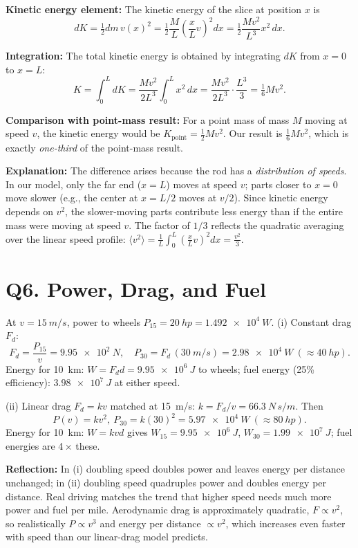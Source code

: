 \documentclass[11pt]{article}
\newcommand{\ans}[1]{\boxed{\displaystyle #1}}
\begin{document}
\textbf{Kinetic energy element:} The kinetic energy of the slice at position $x$ is
\[ dK = \tfrac12 dm\,v(x)^2 = \tfrac12 \frac{M}{L}\left(\frac{x}{L}v\right)^2dx = \tfrac12 \frac{M v^2}{L^3} x^2\,dx. \]

\textbf{Integration:} The total kinetic energy is obtained by integrating $dK$ from $x=0$ to $x=L$:
\[ K = \int_0^L dK = \frac{M v^2}{2L^3}\int_0^L x^2\,dx = \frac{M v^2}{2L^3}\cdot\frac{L^3}{3} = \ans{\tfrac16 M v^2}. \]

\textbf{Comparison with point-mass result:} For a point mass of mass $M$ moving at speed $v$, the kinetic energy would be $K_{\text{point}} = \tfrac12 M v^2$. Our result is $\tfrac16 M v^2$, which is exactly \textit{one-third} of the point-mass result.

\textbf{Explanation:} The difference arises because the rod has a \textit{distribution of speeds}. In our model, only the far end ($x=L$) moves at speed $v$; parts closer to $x=0$ move slower (e.g., the center at $x=L/2$ moves at $v/2$). Since kinetic energy depends on $v^2$, the slower-moving parts contribute less energy than if the entire mass were moving at speed $v$. The factor of $1/3$ reflects the quadratic averaging over the linear speed profile: $\langle v^2 \rangle = \frac{1}{L}\int_0^L \left(\frac{x}{L}v\right)^2 dx = \frac{v^2}{3}$.

\section*{Q6. Power, Drag, and Fuel}
At $v=\SI{15}{m/s}$, power to wheels $P_{15}=\SI{20}{hp}=\SI{1.492e4}{W}$. (i) Constant drag $F_d$:
\[ F_d=\frac{P_{15}}{v}=\ans{\SI{9.95e2}{N}},\quad P_{30}=F_d\,(\SI{30}{m/s})=\ans{\SI{2.98e4}{W}}\ (\approx\SI{40}{hp}). \]
Energy for \SI{10}{km}: $W=F_d d=\ans{\SI{9.95e6}{J}}$ to wheels; fuel energy (25\% efficiency): $\ans{\SI{3.98e7}{J}}$ at either speed.

(ii) Linear drag $F_d=kv$ matched at \SI{15}{m/s}: $k=F_d/v=\ans{\SI{66.3}{N\,s/m}}$. Then
\[ P(v)=kv^2,\ P_{30}=k(30)^2=\ans{\SI{5.97e4}{W}}\ (\approx\SI{80}{hp}). \]
Energy for \SI{10}{km}: $W=kv d$ gives $W_{15}=\ans{\SI{9.95e6}{J}}$, $W_{30}=\ans{\SI{1.99e7}{J}}$; fuel energies are 4\,$\times$ these.

\textbf{Reflection:} In (i) doubling speed doubles power and leaves energy per distance unchanged; in (ii) doubling speed quadruples power and doubles energy per distance. Real driving matches the trend that higher speed needs much more power and fuel per mile. Aerodynamic drag is approximately quadratic, $F\propto v^2$, so realistically $P\propto v^3$ and energy per distance $\propto v^2$, which increases even faster with speed than our linear-drag model predicts.
\end{document}
